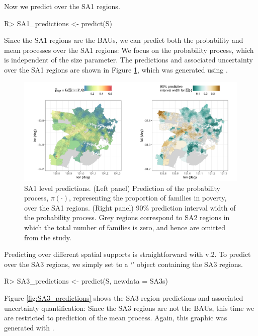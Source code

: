\documentclass[article]{jss}
\newcommand{\class}[1]{`\code{#1}'}
\begin{document}
%

Now we predict over the SA1 regions.
\begin{Code}
R> SA1_predictions <- predict(S)
\end{Code}
Since the SA1 regions are the BAUs, we can predict both the probability and mean processes over the SA1 regions: We focus on the probability process, which is independent of the size parameter. 
The predictions and associated uncertainty over the SA1 regions are shown in Figure \ref{fig:SA1_predictions}, which was generated using .
 \begin{figure}[t!]
    \centering
    \includegraphics[width = \linewidth]{img/Sydney_SA1_predictions.png}
    \caption{SA1 level predictions. (Left panel) Prediction of the probability process, $\pi(\cdot)$, representing the proportion of families in poverty, over the SA1 regions. (Right panel) 90\% prediction interval width of the probability process.
    Grey regions correspond to SA2 regions in which the total number of families is zero, and hence are omitted from the study. 
}   
  \label{fig:SA1_predictions}
\end{figure}


Predicting over different spatial supports is straightforward with  v.2. 
 To predict over the SA3 regions, we simply set  to a  \class{SpatialPolygonsDataFrame} object containing the SA3 regions.
\begin{Code}
R> SA3_predictions <- predict(S, newdata = SA3s)
\end{Code}
Figure \ref{fig:SA3_predictions} shows the SA3 region predictions and associated uncertainty quantification: Since the SA3 regions are not the BAUs, this time we are restricted to prediction of the mean process. Again, this graphic was generated with . 
\end{document}
